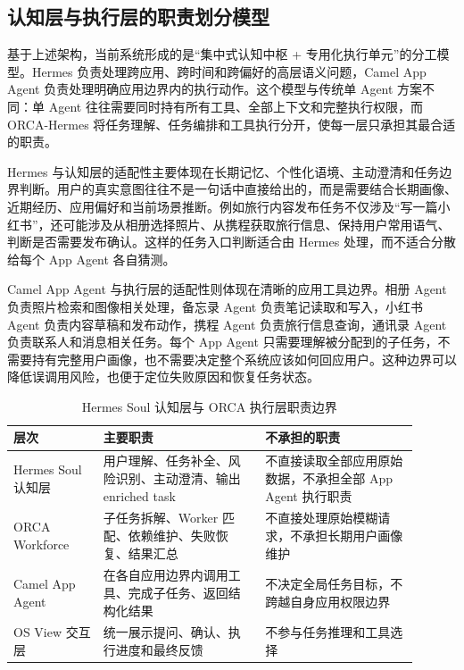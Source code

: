\subsection{认知层与执行层的职责划分模型}

基于上述架构，当前系统形成的是“集中式认知中枢 + 专用化执行单元”的分工模型。Hermes 负责处理跨应用、跨时间和跨偏好的高层语义问题，Camel App Agent 负责处理明确应用边界内的执行动作。这个模型与传统单 Agent 方案不同：单 Agent 往往需要同时持有所有工具、全部上下文和完整执行权限，而 ORCA-Hermes 将任务理解、任务编排和工具执行分开，使每一层只承担其最合适的职责。

Hermes 与认知层的适配性主要体现在长期记忆、个性化语境、主动澄清和任务边界判断。用户的真实意图往往不是一句话中直接给出的，而是需要结合长期画像、近期经历、应用偏好和当前场景推断。例如旅行内容发布任务不仅涉及“写一篇小红书”，还可能涉及从相册选择照片、从携程获取旅行信息、保持用户常用语气、判断是否需要发布确认。这样的任务入口判断适合由 Hermes 处理，而不适合分散给每个 App Agent 各自猜测。

Camel App Agent 与执行层的适配性则体现在清晰的应用工具边界。相册 Agent 负责照片检索和图像相关处理，备忘录 Agent 负责笔记读取和写入，小红书 Agent 负责内容草稿和发布动作，携程 Agent 负责旅行信息查询，通讯录 Agent 负责联系人和消息相关任务。每个 App Agent 只需要理解被分配到的子任务，不需要持有完整用户画像，也不需要决定整个系统应该如何回应用户。这种边界可以降低误调用风险，也便于定位失败原因和恢复任务状态。

\begin{table}[h]
\centering
\begin{tabular}{p{0.20\linewidth}p{0.36\linewidth}p{0.34\linewidth}}
\hline
\textbf{层次} & \textbf{主要职责} & \textbf{不承担的职责} \\
\hline
Hermes Soul 认知层 & 用户理解、任务补全、风险识别、主动澄清、输出 enriched task & 不直接读取全部应用原始数据，不承担全部 App Agent 执行职责 \\
ORCA Workforce & 子任务拆解、Worker 匹配、依赖维护、失败恢复、结果汇总 & 不直接处理原始模糊请求，不承担长期用户画像维护 \\
Camel App Agent & 在各自应用边界内调用工具、完成子任务、返回结构化结果 & 不决定全局任务目标，不跨越自身应用权限边界 \\
OS View 交互层 & 统一展示提问、确认、执行进度和最终反馈 & 不参与任务推理和工具选择 \\
\hline
\end{tabular}
\caption{Hermes Soul 认知层与 ORCA 执行层职责边界}
\label{tab:rt3-layer-responsibility}
\end{table}

